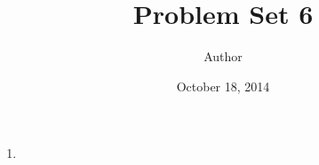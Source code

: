\documentclass[12pt]{article}
\newenvironment{problem}[2][Problem]{\begin{trivlist}
\item[\hskip \labelsep {\bfseries #1}\hskip \labelsep {\bfseries #2.}]}{\end{trivlist}}
\begin{document}
\title{Problem Set 6}
\author{Author}
\date{October 18, 2014}
\maketitle
\begin{problem}{1}
\renewcommand{\labelenumi}{(\alph{enumi})}
\begin{enumerate}
\item
\end{enumerate}
\end{problem}
\end{document}
